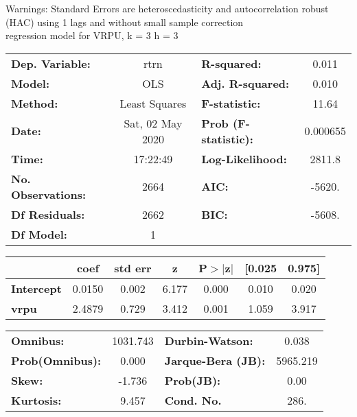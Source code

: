 Warnings: \newline
 [1] Standard Errors are heteroscedasticity and autocorrelation robust (HAC) using 1 lags and without small sample correction\\ 

regression model for VRPU, k = 3 h = 3\begin{center}
\begin{tabular}{lclc}
\toprule
\textbf{Dep. Variable:}    &       rtrn       & \textbf{  R-squared:         } &     0.011   \\
\textbf{Model:}            &       OLS        & \textbf{  Adj. R-squared:    } &     0.010   \\
\textbf{Method:}           &  Least Squares   & \textbf{  F-statistic:       } &     11.64   \\
\textbf{Date:}             & Sat, 02 May 2020 & \textbf{  Prob (F-statistic):} &  0.000655   \\
\textbf{Time:}             &     17:22:49     & \textbf{  Log-Likelihood:    } &    2811.8   \\
\textbf{No. Observations:} &        2664      & \textbf{  AIC:               } &    -5620.   \\
\textbf{Df Residuals:}     &        2662      & \textbf{  BIC:               } &    -5608.   \\
\textbf{Df Model:}         &           1      & \textbf{                     } &             \\
\bottomrule
\end{tabular}
\begin{tabular}{lcccccc}
                   & \textbf{coef} & \textbf{std err} & \textbf{z} & \textbf{P$> |$z$|$} & \textbf{[0.025} & \textbf{0.975]}  \\
\midrule
\textbf{Intercept} &       0.0150  &        0.002     &     6.177  &         0.000        &        0.010    &        0.020     \\
\textbf{vrpu}      &       2.4879  &        0.729     &     3.412  &         0.001        &        1.059    &        3.917     \\
\bottomrule
\end{tabular}
\begin{tabular}{lclc}
\textbf{Omnibus:}       & 1031.743 & \textbf{  Durbin-Watson:     } &    0.038  \\
\textbf{Prob(Omnibus):} &   0.000  & \textbf{  Jarque-Bera (JB):  } & 5965.219  \\
\textbf{Skew:}          &  -1.736  & \textbf{  Prob(JB):          } &     0.00  \\
\textbf{Kurtosis:}      &   9.457  & \textbf{  Cond. No.          } &     286.  \\
\bottomrule
\end{tabular}
\end{center}

